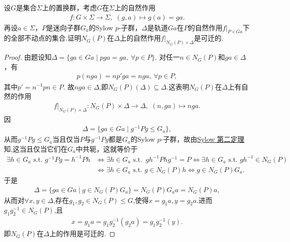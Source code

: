 \documentclass[../../main.tex]{subfiles}%
\begin{document}
\begin{example}
设$G$是集合$\Sigma$上的置换群，考虑$G$在$\Sigma$上的自然作用
\begin{align*}
f: G\times \Sigma\to \Sigma,\,\,(g,a)\mapsto g(a)=ga.
\end{align*}
再设$a\in\Sigma$，$P$是迷向子群$G_a$的Sylow $p$-子群，$\Delta$是轨道$Ga$在$P$的自然作用$f|_{P\times Ga}$下的全部不动点的集合.证明$N_G(P)$在$\Delta$上的自然作用$f|_{N_G(P)\times \Delta}$是可迁的.
\end{example}
\begin{proof}
由题设知$\Delta = \{ga\in Ga \mid pga = ga,\ \forall p\in P\}$. 对任一$n\in N_G(P)$和$ga\in\Delta$，有
\begin{align*}
p(nga) = np'ga = nga,\ \forall p\in P,
\end{align*}
其中$p' = n^{-1}pn\in P$. 故$nga\in \Delta$,即$N_G(P)(\Delta)\subseteq \Delta$.这表明$N_G(P)$在$\Delta$上有自然的作用
\begin{align*}
f|_{N_G(P)\times \Delta}:N_G(P)\times \Delta\to \Delta,\,\,(n,ga)\mapsto nga.
\end{align*}
因
\begin{align*}
\Delta = \{ga\in Ga \mid g^{-1}Pg \leqslant G_a\},
\end{align*}
从而$g^{-1}Pg \leqslant G_a$当且仅当$P$与$g^{-1}Pg$都是$G_a$的Sylow $p$-子群，故由\hyperref[theorem:Sylow 第二定理]{Sylow 第二定理}知,这当且仅当它们在$G_a$中共轭，这就等价于
\begin{align*}
\exists h\in G_a\,\,\mathrm{s}.\mathrm{t}.\,\,g^{-1}Pg=h^{-1}Ph&\Longleftrightarrow \exists h\in G_a\,\,\mathrm{s}.\mathrm{t}.\,\,\,gh^{-1}Phg^{-1}=P\Longleftrightarrow \exists h\in G_a\,\,\mathrm{s}.\mathrm{t}.\,\,gh^{-1}\in N_G(P)
\\
&\Longleftrightarrow \exists h\in G_a\,\,\mathrm{s}.\mathrm{t}.\,\,g\in N_G(P)h\Longleftrightarrow g\in N_G(P)G_a.
\end{align*}
于是
\begin{align*}
\Delta = \{ga\in Ga \mid g\in N_G(P)G_a\} = N_G(P)G_a a = N_G(P)a,
\end{align*}
从而对$\forall x,y\in \Delta$,存在$g_1,g_2\in N_G(P)\leqslant G$,使得$x=g_1a,y=g_2a$.进而$g_1g_2^{-1}\in N_G(P)$,且
\begin{align*}
x=g_1a=g_1g_2^{-1}(g_2a)=g_1g_2^{-1}(y).
\end{align*}
即$N_G(P)$在$\Delta$上的作用是可迁的.
\end{proof}
\end{document}
